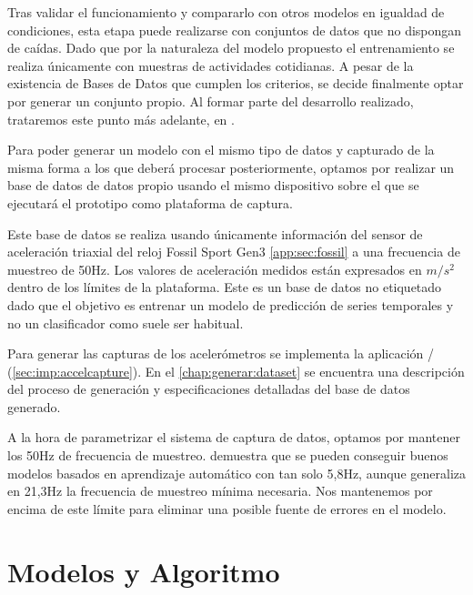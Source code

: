 Tras validar el funcionamiento y compararlo con otros modelos en igualdad de condiciones, esta etapa puede realizarse con conjuntos de datos que no dispongan de caídas. Dado que por la naturaleza del modelo propuesto el entrenamiento se realiza únicamente con muestras de actividades cotidianas. A pesar de la existencia de Bases de Datos que cumplen los criterios, se decide finalmente optar por generar un conjunto propio. Al formar parte del desarrollo realizado, trataremos este punto más adelante, en .




Para poder generar un modelo con el mismo tipo de datos y capturado de la misma forma a los que deberá procesar posteriormente, optamos por realizar un base de datos de datos propio usando el mismo dispositivo sobre el que se ejecutará el prototipo como plataforma de captura.

Este base de datos se realiza usando únicamente información del sensor de aceleración triaxial del reloj Fossil Sport Gen3 \ref{app:sec:fossil} a una frecuencia de muestreo de 50Hz. Los valores de aceleración medidos están expresados en $m/s^2$ dentro de los límites de la plataforma. Este es un base de datos no etiquetado dado que el objetivo es entrenar un modelo de predicción de series temporales y no un clasificador como suele ser habitual.

Para generar las capturas de los acelerómetros se implementa la aplicación \accelcapture/ (\autoref{sec:imp:accelcapture}). En el  \autoref{chap:generar:dataset} se encuentra una descripción del proceso de generación y especificaciones detalladas del base de datos generado.
\iffalse
\todo{no ponerlo como apéndice, es parte importante, ponerlo aquí (referenciar ciertas cosas al apéndice que sean de menor interés)}
\fi
A la hora de parametrizar el sistema de captura de datos, optamos por mantener los 50Hz de frecuencia de muestreo. \cite{Liu2018} demuestra que se pueden conseguir buenos modelos basados en aprendizaje automático con tan solo 5,8Hz, aunque generaliza en 21,3Hz la frecuencia de muestreo mínima necesaria. Nos mantenemos por encima de este límite para eliminar una posible fuente de errores en el modelo.





\section{Modelos y Algoritmo}\label{sec:req:modelos}
\iffalse
\todo{nada de vaguedades, qué modelos, cuales voy a usar, qué valores he calculado yo y cuales vienen de fuera}
Estudios similares han mostrado la mayor capacidad de los sistemas basados en aprendizaje automático. Sin embargo estos algoritmos no han conseguido desplazar en los sistemas comerciales a los métodos analíticos por la gran capacidad de cálculo que requieren. Algunos trabajos han demostrado la eficacia de hibridar los modelos usando un modelo computacionalmente simple para realizar una tarea de detección de candidatos a caídas de fondo y un modelo complejo que actúe únicamente sobre este subconjunto de episodios. Este es el acercamiento que toma este trabajo.
\fi
